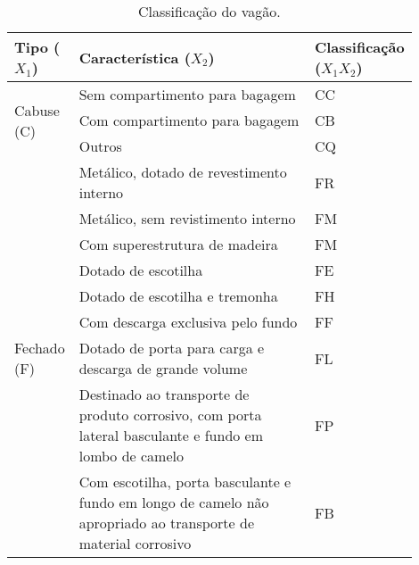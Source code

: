     \begin{longtable}{p{0.15\linewidth}p{0.6\linewidth}p{0.15\linewidth}}
        \caption{Classificação do vagão.\label{tab: tipo vagao ABNT}} \\*
          \hline
        \toprule
        \textbf{Tipo} ($X_1$) & \textbf{Característica} ($X_2$) & \textbf{Classificação} ($X_1X_2$) \\
         \midrule
         \multirow{3}{2.5cm}{Cabuse (C)}    & Sem compartimento para bagagem                            & CC \\
                                            & Com compartimento para bagagem                            & CB \\
                                            & Outros                                                    & CQ \\ \midrule
        \multirow{14}{2.5cm}{Fechado (F)}   & Metálico, dotado de revestimento interno                  & FR \\
                                            & Metálico, sem revistimento interno                        & FM \\
                                            & Com superestrutura de madeira                             & FM \\
                                            & Dotado de escotilha                                       & FE \\
                                            & Dotado de escotilha e tremonha                            & FH \\
                                            & Com descarga exclusiva pelo fundo                         & FF \\
                                            & Dotado de porta para carga e descarga de grande volume    & FL \\
                                            & Destinado ao transporte de produto corrosivo, com porta 
                                                            lateral basculante e fundo em lombo de camelo & FP\\
                                            & Com escotilha, porta basculante e fundo em longo de camelo
                                                não apropriado ao transporte de material corrosivo         & FB \\

\end{longtable}

